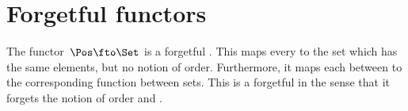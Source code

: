 \section{Forgetful functors}


\begin{example}
    The functor~$\Pos \fto \Set$ is a forgetful .
    This  maps every  to the set which has the same elements, but no notion of order.
    Furthermore, it maps each  between  to the corresponding function between sets.
    This is a forgetful  in the sense that it forgets the notion of order and .
\end{example}
